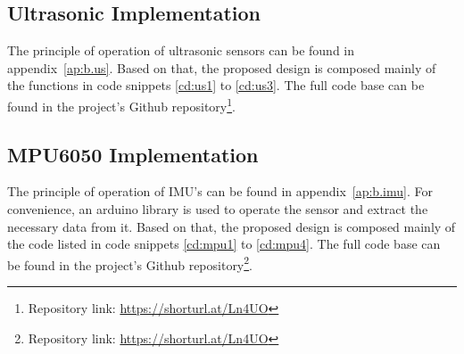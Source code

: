 \subsection{Ultrasonic Implementation}
The principle of operation of ultrasonic sensors can be found in appendix~\ref{ap:b.us}. Based on that, the proposed design is composed mainly of the functions in code snippets \ref{cd:us1} to \ref{cd:us3}. The full code base can be found in the project's Github repository\footnote{Repository link: \url{https://shorturl.at/Ln4UO}}.
\vspace{3mm}

% 
% 
\vspace{3mm}

\newpage

\vspace{-3mm}
\subsection{MPU6050 Implementation}
\vspace{-1mm}
The principle of operation of IMU's can be found in appendix~\ref{ap:b.imu}. For convenience, an arduino library is used to operate the sensor and extract the necessary data from it. Based on that, the proposed design is composed mainly of the code listed in code snippets \ref{cd:mpu1} to \ref{cd:mpu4}. The full code base can be found in the project's Github repository\footnote{Repository link: \url{https://shorturl.at/Ln4UO}}.

\vspace{1mm}



\newpage
% 


